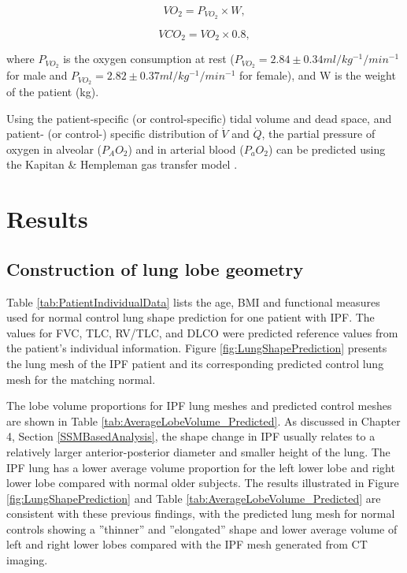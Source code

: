 \begin{equation} 
 \label{eq:O2ConsumptionEstimation}
 VO_2 = P_{VO_2} \times W,
\end{equation}

\begin{equation} 
 \label{eq:CO2ConsumptionEstimation}
 VCO_2 = VO_2 \times 0.8,
\end{equation}

\noindent where $P_{VO_2}$ is the oxygen consumption at rest ($P_{VO_2} = 2.84 \pm 0.34 ml/kg^{-1}/min^{-1}$ for male and $P_{VO_2} = 2.82 \pm 0.37 ml/kg^{-1}/min^{-1}$ for female), and W is the weight of the patient (kg).

Using the patient-specific (or control-specific) tidal volume and dead space, and patient- (or control-) specific distribution of $\dot{V}$ and $\dot{Q}$, the partial pressure of oxygen in alveolar ($P_AO_2$) and in arterial blood ($P_aO_2$) can be predicted using the Kapitan \& Hempleman gas transfer model \citep{kapitan1986computer}.
\newpage

\section{Results}
\subsection{Construction of lung lobe geometry}
Table \ref{tab:PatientIndividualData} lists the age, BMI and functional measures used for normal control lung shape prediction for one patient with IPF. The values for FVC, TLC, RV/TLC, and DLCO were predicted reference values from the patient's individual information. Figure \ref{fig:LungShapePrediction} presents the lung mesh of the IPF patient and its corresponding predicted control lung mesh for the matching normal. 

The lobe volume proportions for IPF lung meshes and predicted control meshes are shown in Table \ref{tab:AverageLobeVolume_Predicted}. As discussed in Chapter 4, Section \ref{SSMBasedAnalysis}, the shape change in IPF usually relates to a relatively larger anterior-posterior diameter and smaller height of the lung. The IPF lung has a lower average volume proportion for the left lower lobe and right lower lobe compared with normal older subjects. The results illustrated in Figure \ref{fig:LungShapePrediction} and Table \ref{tab:AverageLobeVolume_Predicted} are consistent with these previous findings, with the predicted lung mesh for normal controls showing a ''thinner'' and ''elongated'' shape and lower average volume of left and right lower lobes compared with the IPF mesh generated from CT imaging.

